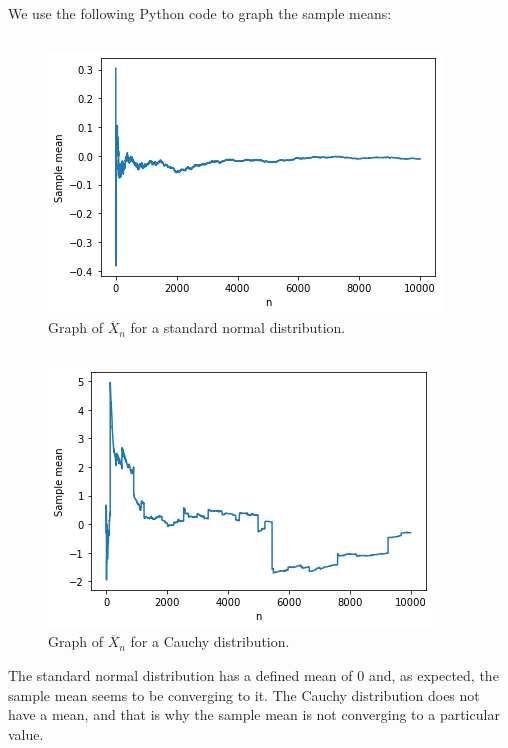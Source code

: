 \begin{ex}
  We use the following Python code to graph the sample means:

  \inputminted{python}{src/03-09a.py}

  \begin{figure}[H]
    \centering
    \includegraphics[scale=0.9]{part1/ch03-09a}
    \caption{Graph of $\overline{X}_n$ for a standard normal distribution.}
  \end{figure}

  \inputminted{python}{src/03-09b.py}

  \begin{figure}[H]
    \centering
    \includegraphics[scale=0.9]{part1/ch03-09b}
    \caption{Graph of $\overline{X}_n$ for a Cauchy distribution.}
  \end{figure}

  The standard normal distribution has a defined mean of $0$ and, as expected,
  the sample mean seems to be converging to it. The Cauchy distribution does not
  have a mean, and that is why the sample mean is not converging to a particular
  value.
\end{ex}


